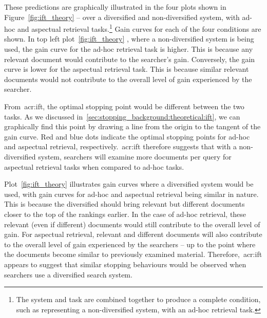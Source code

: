 These predictions are graphically illustrated in the four plots shown in Figure~\ref{fig:ift_theory} -- over a diversified  and non-diversified  system, with ad-hoc  and aspectual  retrieval tasks.\footnote{The system and task are combined together to produce a complete condition, such as  representing a non-diversified system, with an ad-hoc retrieval task.} Gain curves for each of the four conditions are shown. In top left plot~\ref{fig:ift_theory} , where a non-diversified system is being used, the gain curve for the ad-hoc retrieval task is higher. This is because any relevant document would contribute to the searcher's gain. Conversely, the gain curve is lower for the aspectual retrieval task. This is because similar relevant documents would not contribute to the overall level of gain experienced by the searcher.

From~\gls{acr:ift}, the optimal stopping point would be different between the two tasks. As we discussed in~\ref{sec:stopping_background:theoretical:ift}, we can graphically find this point by drawing a line from the origin to the tangent of the gain curve. Red and blue dots indicate the optimal stopping points for ad-hoc and aspectual retrieval, respectively.~\gls{acr:ift} therefore suggests that with a non-diversified system, searchers will examine more documents per query for aspectual retrieval tasks when compared to ad-hoc tasks.

Plot~\ref{fig:ift_theory}  illustrates gain curves where a diversified system would be used, with gain curves for ad-hoc and aspectual retrieval being similar in nature. This is because the diversified should bring relevant but different documents closer to the top of the rankings earlier. In the case of ad-hoc retrieval, these relevant (even if different) documents would still contribute to the overall level of gain. For aspectual retrieval, relevant and different documents will also contribute to the overall level of gain experienced by the searchers -- up to the point where the documents become similar to previously examined material. Therefore,~\gls{acr:ift} appears to suggest that similar stopping behaviours would be observed when searchers use a diversified search system.

